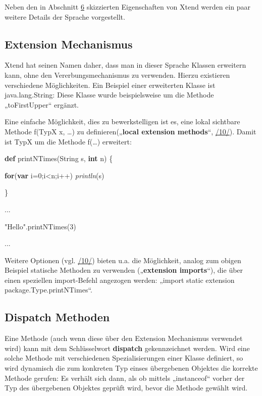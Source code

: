 \documentclass[a4]{article}
\begin{document}
Neben den in Abschnitt \protect\hyperlink{anchor-33}{6} skizzierten
Eigenschaften von Xtend werden ein paar weitere Details der Sprache
vorgestellt.

\subsection[Extension
Mechanismus]{\texorpdfstring{\protect\hypertarget{anchor-37}{}{}Extension
Mechanismus}{Extension Mechanismus}}\label{extension-mechanismus}

Xtend hat seinen Namen daher, dass man in dieser Sprache Klassen
erweitern kann, ohne den Vererbungsmechanismus zu verwenden. Hierzu
existieren verschiedene Möglichkeiten. Ein Beispiel einer erweiterten
Klasse ist java.lang.String: Diese Klasse wurde beispielsweise um die
Methode „toFirstUpper`` ergänzt.

Eine einfache Möglichkeit, dies zu bewerkstelligen ist es, eine lokal
sichtbare Methode f(TypX x, \ldots{}) zu definieren(„\textbf{local
extension methods}``, \protect\hyperlink{anchor-12}{/10/}). Damit ist
TypX um die Methode f(\ldots{}) erweitert:

\textbf{def} printNTimes(String s, \textbf{int} n) \{

\textbf{for}(\textbf{var} i=0;i\textless{}n;i++) \emph{println}(s)

\}

...

"Hello".printNTimes(3)

...

Weitere Optionen (vgl. \protect\hyperlink{anchor-12}{/10/}) bieten u.a.
die Möglichkeit, analog zum obigen Beispiel statische Methoden zu
verwenden („\textbf{extension imports}``), die über einen speziellen
import-Befehl angezogen werden: „import static extension
package.Type.printNTimes``.

\subsection[Dispatch
Methoden]{\texorpdfstring{\protect\hypertarget{anchor-38}{}{}\protect\hypertarget{anchor-39}{}{}Dispatch
Methoden}{Dispatch Methoden}}\label{dispatch-methoden}

Eine Methode (auch wenn diese über den Extension Mechanismus verwendet
wird) kann mit dem Schlüsselwort \textbf{dispatch }gekennzeichnet
werden. Wird eine solche Methode mit verschiedenen Spezialisierungen
einer Klasse definiert, so wird dynamisch die zum konkreten Typ einses
übergebenen Objektes die korrekte Methode gerufen: Es verhält sich dann,
als ob mittels „instanceof`` vorher der Typ des übergebenen Objektes
geprüft wird, bevor die Methode gewählt wird.
\end{document}
